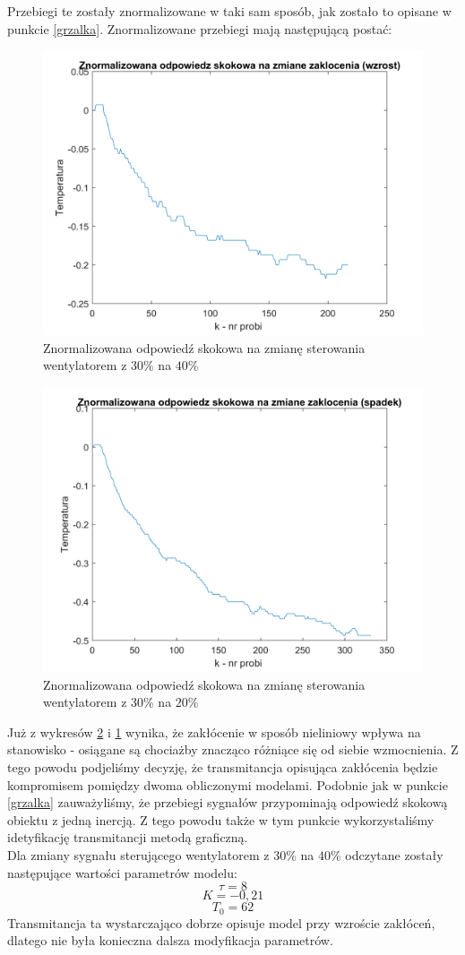 \documentclass[12pt, a4paper]{article}
\begin{document}
Przebiegi te zostały znormalizowane w taki sam sposób, jak zostało to opisane w punkcie \ref{grzalka}. Znormalizowane przebiegi mają następującą postać:
\begin{figure}[H]
	\centering
	\includegraphics[width=0.9\linewidth]{nor_od_skok_wg}
	\caption{Znormalizowana odpowiedź skokowa na zmianę sterowania wentylatorem z $30\%$ na $40\%$}
	\label{fig:noswg}
\end{figure}
\begin{figure}[H]
	\centering
	\includegraphics[width=0.9\linewidth]{nor_od_skok_wd}
	\caption{Znormalizowana odpowiedź skokowa na zmianę sterowania wentylatorem z $30\%$ na $20\%$}
	\label{fig:noswd}
\end{figure}
Już z wykresów \ref{fig:noswd} i \ref{fig:noswg} wynika, że zakłócenie w sposób nieliniowy wpływa na stanowisko - osiągane są chociażby znacząco różniące się od siebie wzmocnienia. Z tego powodu podjeliśmy decyzję, że transmitancja opisująca zakłócenia będzie kompromisem pomiędzy dwoma obliczonymi modelami. 
Podobnie jak w punkcie \ref{grzalka} zauważyliśmy, że przebiegi sygnałów przypominają odpowiedź skokową obiektu z jedną inercją. Z tego powodu także w tym punkcie wykorzystaliśmy idetyfikację transmitancji metodą graficzną.\\
Dla zmiany sygnału sterującego wentylatorem z $30\%$ na $40\%$ odczytane zostały następujące wartości parametrów modelu:
\[\tau=8\]
\[K=-0,21\]
\[T_{0}=62\]
Transmitancja ta wystarczająco dobrze opisuje model przy wzroście zakłóceń, dlatego nie była konieczna dalsza modyfikacja parametrów.
\end{document}
